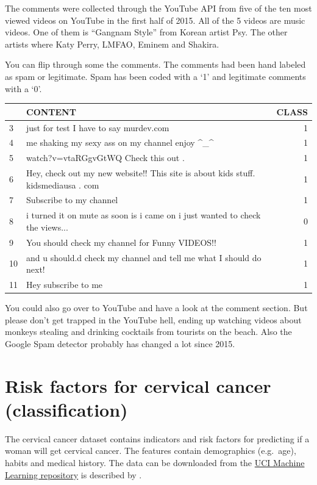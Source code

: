 \documentclass[12pt,]{krantz}
\theoremstyle{definition}
\theoremstyle{definition}
\theoremstyle{definition}
\theoremstyle{remark}
\begin{document}
The comments were collected through the YouTube API from five of the ten
most viewed videos on YouTube in the first half of 2015. All of the 5
videos are music videos. One of them is ``Gangnam Style'' from Korean
artist Psy. The other artists where Katy Perry, LMFAO, Eminem and
Shakira.

You can flip through some the comments. The comments had been hand
labeled as spam or legitimate. Spam has been coded with a `1' and
legitimate comments with a `0'.

\begin{tabular}{l|l|r}
\hline
  & CONTENT & CLASS\\
\hline
3 & just for test I have to say murdev.com & 1\\
\hline
4 & me shaking my sexy ass on my channel enjoy \textasciicircum{}\_\textasciicircum{} & 1\\
\hline
5 & watch?v=vtaRGgvGtWQ   Check this out . & 1\\
\hline
6 & Hey, check out my new website!! This site is about kids stuff. kidsmediausa  . com & 1\\
\hline
7 & Subscribe to my channel & 1\\
\hline
8 & i turned it on mute as soon is i came on i just wanted to check the  views... & 0\\
\hline
9 & You should check my channel for Funny VIDEOS!! & 1\\
\hline
10 & and u should.d check my channel and tell me what I should do next! & 1\\
\hline
11 & Hey subscribe to me & 1\\
\hline
\end{tabular}

You could also go over to YouTube and have a look at the comment
section. But please don't get trapped in the YouTube hell, ending up
watching videos about monkeys stealing and drinking cocktails from
tourists on the beach. Also the Google Spam detector probably has
changed a lot since 2015.

\section{Risk factors for cervical cancer
(classification)}\label{cervical-data}

The cervical cancer dataset contains indicators and risk factors for
predicting if a woman will get cervical cancer. The features contain
demographics (e.g.~age), habits and medical history. The data can be
downloaded from the
\href{https://archive.ics.uci.edu/ml/datasets/Cervical+cancer+\%28Risk+Factors\%29}{UCI
Machine Learning repository} is described by
\citet{fernandes2017transfer}.
\end{document}
